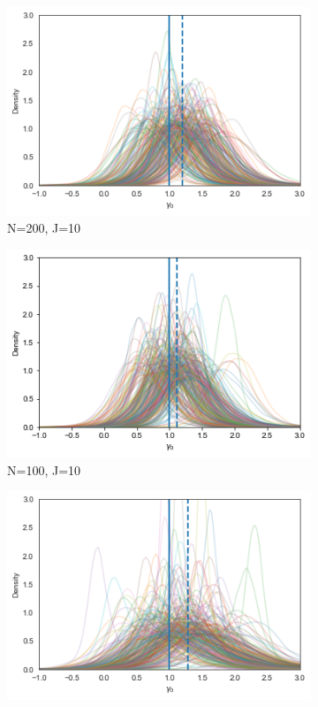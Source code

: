 \begin{figure}[H]
  \centering
  \begin{subfigure}[b]{0.3\linewidth}
    \includegraphics[width=\linewidth]{graphics/posterior_plot_gamma0_wrong}
    \caption{ N=200, J=10}
  \end{subfigure}
  \begin{subfigure}[b]{0.3\linewidth}
    \includegraphics[width=\linewidth]{graphics/posterior_plot_gamma0_wrong_smallN}
    \caption{ N=100, J=10}
  \end{subfigure}
  \begin{subfigure}[b]{0.3\linewidth}
    \includegraphics[width=\linewidth]{graphics/posterior_plot_gamma0_wrong_smallJ}

\end{subfigure}
\end{figure}
